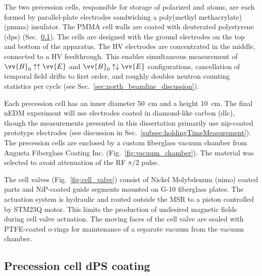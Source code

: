 The two precession cells, responsible for storage of polarized \ucn and \hg atoms, are each formed by parallel-plate electrodes sandwiching a poly(methyl methacrylate) (\acrshort*{pmma}) insulator. The PMMA cell walls are coated with deuterated polystyrene (\acrshort*{dps}) (Sec.~\ref{sec:dPS_coating}). The cells are designed with the ground electrodes on the top and bottom of the apparatus. The HV electrodes are concentrated in the middle, connected to a HV feedthrough. This enables simultaneous measurement of $\vv{B}_0\uparrow\uparrow\vv{E}$ and $\vv{B}_0\uparrow\downarrow\vv{E}$ configurations, cancellation of temporal field drifts to first order, and roughly doubles neutron counting statistics per cycle (see Sec.~\ref{sec:north_beamline_discussion}).

Each precession cell has an inner diameter \qty{50}{cm} and a height \qty{10}{cm}. The final nEDM experiment will use electrodes coated in diamond-like carbon (\acrshort*{dlc}), though the measurements presented in this dissertation primarily use \acrshort{nip}-coated prototype electrodes (see discussion in Sec.~\ref{subsec:holdingTimeMeasurement}). The precession cells are enclosed by a custom fiberglass vacuum chamber from Augusta Fiberglass Coating Inc. (Fig.~\ref{fig:vacuum_chamber}). The material was selected to avoid attenuation of the RF $\pi/2$ pulse.

The cell valves (Fig.~\ref{fig:cell_valve}) consist of Nickel Molybdenum (\acrshort*{nimo}) coated parts and NiP-coated guide segments mounted on G-10 fiberglass plates. The actuation system is hydraulic and routed outside the MSR to a piston controlled by STM23Q motor. This limits the production of undesired magnetic fields during cell valve actuation. The moving faces of the cell valve are sealed with PTFE-coated o-rings for maintenance of a separate vacuum from the vacuum chamber.


\subsection{Precession cell dPS coating}\label{sec:dPS_coating}


